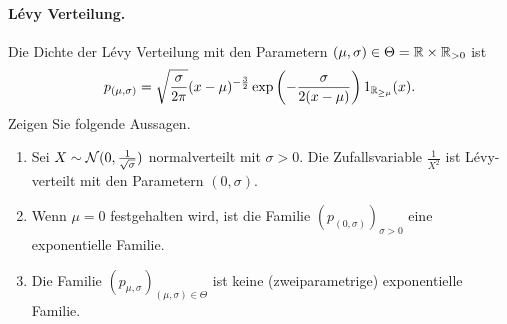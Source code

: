 \paragraph{L\'evy Verteilung.} Die Dichte der L\'evy Verteilung mit den
Parametern $(\mu,\sigma)\in \Theta = \mathbb R \times \mathbb R_{>0}$ ist
\begin{equation*}
    p_{(\mu, \sigma)} = \sqrt{ \frac{\sigma}{2\pi}} (x-\mu)^{-\frac{3}{2}} 
    \exp\left( -\frac{\sigma}{2(x-\mu)} \right) 1_{\mathbb R_{\geq \mu}} (x).
\end{equation*}
Zeigen Sie folgende Aussagen.
\begin{enumerate}
    \item Sei $X\sim \mathcal N (0, \frac{1}{\sqrt{\sigma}})$ normalverteilt mit $\sigma>0$.
        Die Zufallsvariable $\frac{1}{X^2}$ ist L\'evy-verteilt mit den Parametern
        $(0,\sigma)$.
    \item Wenn $\mu=0$ festgehalten wird, ist die Familie $(p_{(0,\sigma)})_{\sigma>0}$
        eine exponentielle Familie. 
    \item Die Familie $(p_{\mu,\sigma})_{(\mu,\sigma)\in\Theta}$ ist keine
        (zweiparametrige) exponentielle Familie. 
\end{enumerate}








